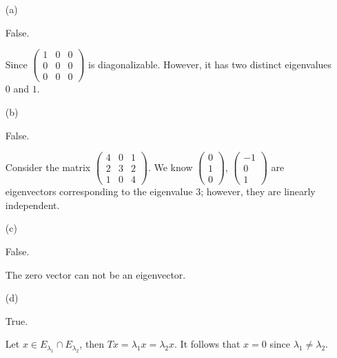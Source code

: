 \begin{Exercise}
	\begin{enumerate}[(a)]
		\item[(a)]
		\begin{answer}
			False.
		\end{answer}
		\begin{solution}
			Since $\begin{pmatrix}
			1 & 0 & 0 \\
			0 & 0 & 0 \\
			0 & 0 & 0
			\end{pmatrix}$ is diagonalizable. However, it has two distinct eigenvalues $0$ and $1$.
		\end{solution}
		
		\item[(b)]
		\begin{answer}
			False.
		\end{answer}
		\begin{solution}
			Consider the matrix $\begin{pmatrix}
			4 & 0 & 1 \\
			2 & 3 & 2 \\
			1 & 0 & 4
			\end{pmatrix}$. We know $\begin{pmatrix}
			0 \\
			1 \\
			0
			\end{pmatrix}$, $\begin{pmatrix}
			-1 \\
			0 \\
			1
			\end{pmatrix}$ are eigenvectors corresponding to the eigenvalue $3$; however, they are linearly independent.
		\end{solution}
		
		\item[(c)]
		\begin{answer}
			False.
		\end{answer}
		\begin{solution}
			The zero vector can not be an eigenvector.
		\end{solution}
		
		\item[(d)]
		\begin{answer}
			True.
		\end{answer}
		\begin{solution}
			Let $x\in E_{\lambda_1}\cap E_{\lambda_2}$, then $T x = \lambda_1 x = \lambda_2 x$. It follows that $x=0$ since $\lambda_1 \neq \lambda_2$.
		\end{solution}
		

\end{enumerate}
\end{Exercise}
